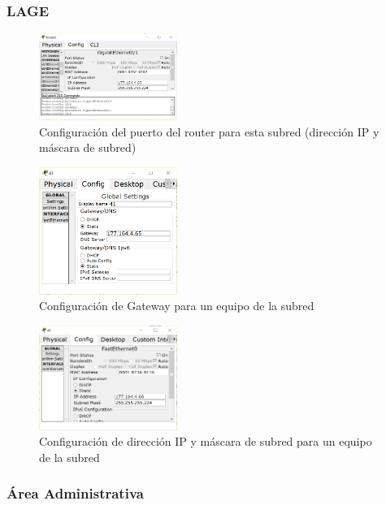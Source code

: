 \documentclass[../main.tex]{subfiles}
\begin{document}
\subsubsection*{LAGE}

\begin{figure}[H]
  \centering
  \includegraphics[width=0.4\textwidth]{images/2-port.PNG}
  \caption{Configuración del puerto del router para esta subred (dirección IP y máscara de subred)}\label{fig:ej21}
\end{figure}

\begin{figure}[H]
  \centering
  \includegraphics[width=0.4\textwidth]{images/2-g.PNG}
  \caption{Configuración de Gateway para un equipo de la subred}\label{fig:ej22}
\end{figure}

\begin{figure}[H]
  \centering
  \includegraphics[width=0.4\textwidth]{images/2-ip.PNG}
  \caption{Configuración de dirección IP y máscara de subred para un equipo de la subred}\label{fig:ej23}
\end{figure}

\subsubsection*{Área Administrativa}
\end{document}
